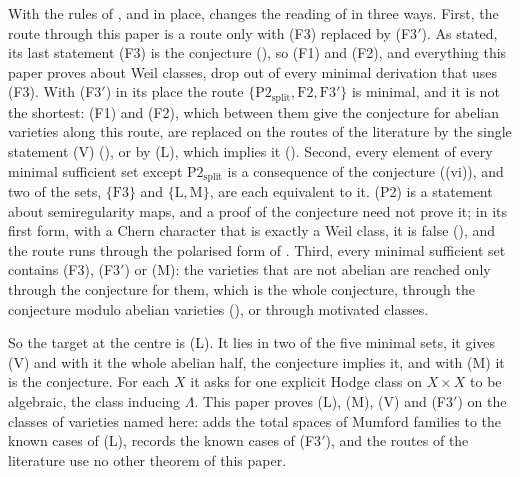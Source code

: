 \begin{remark}\label{rem:bullseye}
With the rules of ,  and
 in place,  changes the reading of
 in three ways. First, the route through this paper is
a route only with (F3) replaced by \textup{(F3$'$)}. As stated, its last
statement (F3) is the conjecture (), so (F1) and (F2), and
everything this paper proves about Weil classes, drop out of every minimal
derivation that uses (F3). With \textup{(F3$'$)} in its place the route
$\{\mathrm{P2}_{\mathrm{split}},\mathrm{F2},\mathrm{F3}'\}$ is minimal, and it is not the
shortest: (F1) and (F2), which between them give the conjecture for abelian
varieties along this route, are replaced on the routes of the literature by
the single statement \textup{(V)} (), or by \textup{(L)},
which implies it (). Second, every element of every minimal sufficient set
except $\mathrm{P2}_{\mathrm{split}}$ is a consequence of the conjecture
((vi)), and
two of the sets, $\{\mathrm{F3}\}$ and $\{\mathrm{L},\mathrm{M}\}$, are
each equivalent to it. (P2) is a statement about semiregularity maps, and a
proof of the conjecture need not prove it; in its first form, with a Chern
character that is exactly a Weil class, it is false (), and
the route runs through the polarised form of . Third, every minimal sufficient set
contains (F3), \textup{(F3$'$)} or \textup{(M)}: the varieties that are not
abelian are reached only through the conjecture for them, which is the whole
conjecture, through the conjecture modulo abelian varieties
(), or through motivated classes.

So the target at the centre is \textup{(L)}. It lies in two of the five
minimal sets, it gives \textup{(V)} and with it the whole abelian half, the
conjecture implies it, and with \textup{(M)} it is the conjecture. For each
$X$ it asks for one explicit Hodge class on $X\times X$ to be algebraic, the
class inducing $\Lambda$. This paper proves \textup{(L)}, \textup{(M)},
\textup{(V)} and \textup{(F3$'$)} on the classes of varieties named here:
 adds the total spaces of Mumford families to the
known cases of \textup{(L)},  records the known cases of
\textup{(F3$'$)}, and the routes of the literature use no other theorem of
this paper.
\end{remark}

